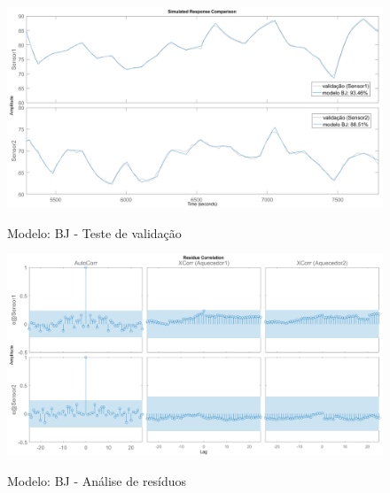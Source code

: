 \begin{apendicesenv}
\begin{figure}
	\caption{Modelo: BJ - Teste de validação}
	\begin{center}
		\includegraphics[width=1.00\textwidth]{./5_images/tclabsp-models-BJ-compare.png} 
		\label{fig:tclabsp-models-bj-compare}
	\end{center}
	\centering
\end{figure}

\begin{figure}
	\caption{Modelo: BJ - Análise de resíduos}
	\begin{center}
		\includegraphics[width=1.00\textwidth]{./5_images/tclabsp-models-BJ-resid.png} 
		\label{fig:tclabsp-models-bj-resid}
	\end{center}
	\centering
\end{figure}


\end{apendicesenv}